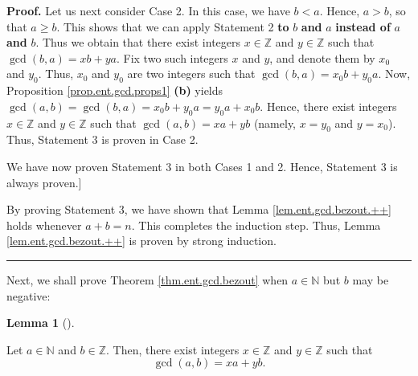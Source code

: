 \documentclass[numbers=enddot,12pt,final,onecolumn,notitlepage]{scrartcl}%
\numberwithin{exer}{subsection}
\theoremstyle{definition}
\newtheorem{lem}[theo]{Lemma}
\newenvironment{lemma}[1][]
{\begin{lem}[#1]\begin{leftbar}}
{\end{leftbar}\end{lem}}
\newenvironment{proof}[1][Proof]{\noindent\textbf{#1.} }{\ \rule{0.5em}{0.5em}}
\begin{document}
\begin{proof}
Let us next consider Case 2. In this case, we have $b<a$. Hence, $a>b$, so
that $a\geq b$. This shows that we can apply Statement 2 \textbf{to }%
$b$\textbf{ and }$a$ \textbf{instead of }$a$ \textbf{and }$b$. Thus we obtain
that there exist integers $x\in\mathbb{Z}$ and $y\in\mathbb{Z}$ such that
$\gcd\left(  b,a\right)  =xb+ya$. Fix two such integers $x$ and $y$, and
denote them by $x_{0}$ and $y_{0}$. Thus, $x_{0}$ and $y_{0}$ are two integers
such that $\gcd\left(  b,a\right)  =x_{0}b+y_{0}a$. Now, Proposition
\ref{prop.ent.gcd.props1} \textbf{(b)} yields $\gcd\left(  a,b\right)
=\gcd\left(  b,a\right)  =x_{0}b+y_{0}a=y_{0}a+x_{0}b$. Hence, there exist
integers $x\in\mathbb{Z}$ and $y\in\mathbb{Z}$ such that $\gcd\left(
a,b\right)  =xa+yb$ (namely, $x=y_{0}$ and $y=x_{0}$). Thus, Statement 3 is
proven in Case 2.

We have now proven Statement 3 in both Cases 1 and 2. Hence, Statement 3 is
always proven.]

By proving Statement 3, we have shown that Lemma \ref{lem.ent.gcd.bezout.++}
holds whenever $a+b=n$. This completes the induction step. Thus, Lemma
\ref{lem.ent.gcd.bezout.++} is proven by strong induction.
\end{proof}

Next, we shall prove Theorem \ref{thm.ent.gcd.bezout} when $a\in\mathbb{N}$
but $b$ may be negative:

\begin{lemma}
\label{lem.ent.gcd.bezout.+}Let $a\in\mathbb{N}$ and $b\in\mathbb{Z}$. Then,
there exist integers $x\in\mathbb{Z}$ and $y\in\mathbb{Z}$ such that%
\[
\gcd\left(  a,b\right)  =xa+yb.
\]

\end{lemma}
\end{document}

